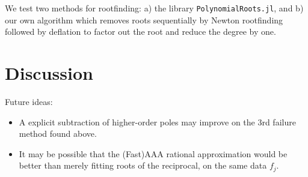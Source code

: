 \documentclass[11pt]{article}
\newcommand{\bi}{\begin{itemize}}
\newcommand{\ei}{\end{itemize}}
\begin{document}
We test two methods for rootfinding: a) the library {\tt PolynomialRoots.jl},
and b) our own algorithm which removes roots sequentially by Newton rootfinding
followed by deflation to factor out the root and reduce the degree by one.



\section{Discussion}


Future ideas:
\bi
\item A explicit subtraction of higher-order poles may improve on the 3rd
  failure method found above.
\item
  It may be possible that the (Fast)AAA rational approximation would be
  better than merely fitting roots of the reciprocal, on the same data $f_j$.
\ei



\end{document}
